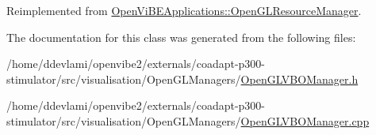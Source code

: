 Reimplemented from \hyperlink{classOpenViBEApplications_1_1OpenGLResourceManager_a5dfc8286721f8ec13adc4a0f7209e3e4}{OpenViBEApplications::OpenGLResourceManager}.



The documentation for this class was generated from the following files:\begin{DoxyCompactItemize}
\item 
/home/ddevlami/openvibe2/externals/coadapt-\/p300-\/stimulator/src/visualisation/OpenGLManagers/\hyperlink{OpenGLVBOManager_8h}{OpenGLVBOManager.h}\item 
/home/ddevlami/openvibe2/externals/coadapt-\/p300-\/stimulator/src/visualisation/OpenGLManagers/\hyperlink{OpenGLVBOManager_8cpp}{OpenGLVBOManager.cpp}\end{DoxyCompactItemize}
